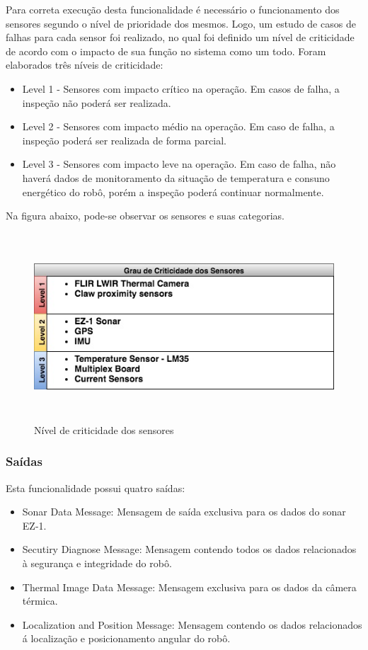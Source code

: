 Para correta execução desta funcionalidade é necessário o funcionamento dos sensores segundo o nível de prioridade dos mesmos. Logo, um estudo de casos de falhas para cada sensor foi realizado, no qual foi definido um nível de criticidade de acordo com o impacto de sua função no sistema como um todo. Foram elaborados três níveis de criticidade:
\begin{itemize}
	\item Level 1 - Sensores com impacto crítico na operação. Em casos de falha, a inspeção não poderá ser realizada.
	\item Level 2 - Sensores com impacto médio na operação. Em caso de falha, a inspeção poderá ser realizada de forma parcial.
	\item Level 3 - Sensores com impacto leve na operação. Em caso de falha, não haverá dados de monitoramento da situação de temperatura e consuno energético do robô, porém a inspeção poderá continuar normalmente.
\end{itemize}

Na figura abaixo, pode-se observar os sensores e suas categorias.

\begin{figure}[!ht]
	\centering
	\includegraphics[height=7cm, width=14cm]{Figures/criticidade.jpg}
	\caption{Nível de criticidade dos sensores} \label{FuncAquisition}
\end{figure}

\subsubsection{Saídas}

Esta funcionalidade possui quatro saídas:

\begin{itemize}
	\item Sonar Data Message: Mensagem de saída exclusiva para os dados do sonar EZ-1.
	\item Secutiry Diagnose Message: Mensagem contendo todos os dados relacionados à segurança e integridade do robô.
	\item Thermal Image Data Message: Mensagem exclusiva para os dados da câmera térmica.
	\item Localization and Position Message: Mensagem contendo os dados relacionados á localização e posicionamento angular do robô.
\end{itemize}

